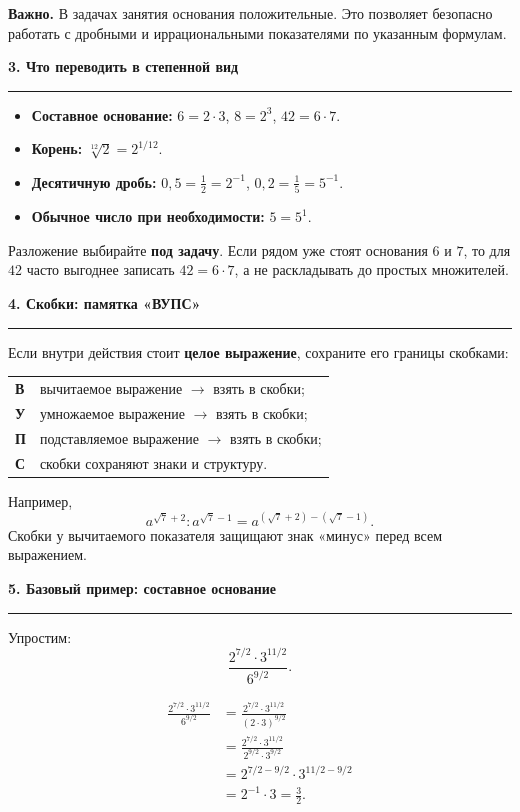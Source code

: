 \documentclass[a4paper,12pt]{article}
\newcommand{\sectionline}[1]{%
  \vspace{0.65em}%
  {\large\bfseries\color{darkaccent}#1}\par
  \vspace{0.18em}\color{rulegray}\hrule\color{textgray}\vspace{0.45em}%
}
\begin{document}
\textbf{Важно.} В задачах занятия основания положительные. Это позволяет безопасно работать с дробными и иррациональными показателями по указанным формулам.

\sectionline{3. Что переводить в степенной вид}

\begin{itemize}
  \item \textbf{Составное основание:} $6=2\cdot3$, $8=2^3$, $42=6\cdot7$.
  \item \textbf{Корень:} $\sqrt[12]{2}=2^{1/12}$.
  \item \textbf{Десятичную дробь:} $0{,}5=\frac12=2^{-1}$, \quad $0{,}2=\frac15=5^{-1}$.
  \item \textbf{Обычное число при необходимости:} $5=5^1$.
\end{itemize}

Разложение выбирайте \textbf{под задачу}. Если рядом уже стоят основания $6$ и $7$, то для $42$ часто выгоднее записать $42=6\cdot7$, а не раскладывать до простых множителей.

\sectionline{4. Скобки: памятка «ВУПС»}

Если внутри действия стоит \textbf{целое выражение}, сохраните его границы скобками:

\begin{center}
\begin{tabular}{@{}ll@{}}
\toprule
\textbf{В} & вычитаемое выражение \(\rightarrow\) взять в скобки;\\
\textbf{У} & умножаемое выражение \(\rightarrow\) взять в скобки;\\
\textbf{П} & подставляемое выражение \(\rightarrow\) взять в скобки;\\
\textbf{С} & скобки сохраняют знаки и структуру.\\
\bottomrule
\end{tabular}
\end{center}

Например,
\[
  a^{\sqrt7+2}:a^{\sqrt7-1}
  =a^{(\sqrt7+2)-(\sqrt7-1)}.
\]
Скобки у вычитаемого показателя защищают знак «минус» перед всем выражением.

\sectionline{5. Базовый пример: составное основание}

Упростим:
\[
\frac{2^{7/2}\cdot3^{11/2}}{6^{9/2}}.
\]

\begin{align*}
\frac{2^{7/2}\cdot3^{11/2}}{6^{9/2}}
&=\frac{2^{7/2}\cdot3^{11/2}}{(2\cdot3)^{9/2}}\\
&=\frac{2^{7/2}\cdot3^{11/2}}{2^{9/2}\cdot3^{9/2}}\\
&=2^{7/2-9/2}\cdot3^{11/2-9/2}\\
&=2^{-1}\cdot3=\frac32.
\end{align*}
\end{document}
